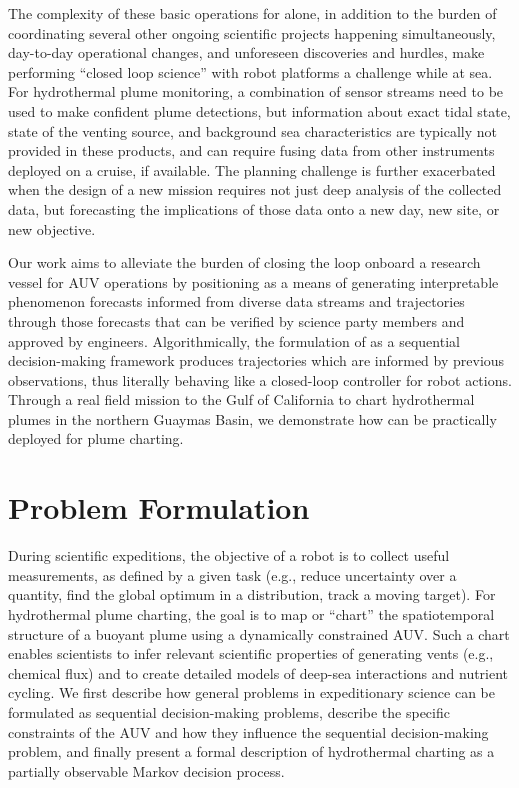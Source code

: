 The complexity of these basic operations for \Sentry alone, in addition to the burden of coordinating several other ongoing scientific projects happening simultaneously, day-to-day operational changes, and unforeseen discoveries and hurdles, make performing ``closed loop science'' with robot platforms a challenge while at sea. For hydrothermal plume monitoring, a combination of sensor streams need to be used to make confident plume detections\autocite{jakuba2007stochastic}, but information about exact tidal state, state of the venting source, and background sea characteristics are typically not provided in these products, and can require fusing data from other instruments deployed on a cruise, if available. The planning challenge is further exacerbated when the design of a new mission requires not just deep analysis of the collected data, but forecasting the implications of those data onto a new day, new site, or new objective. 

Our work aims to alleviate the burden of closing the loop onboard a research vessel for AUV operations by positioning \PHORTEX as a means of generating interpretable phenomenon forecasts informed from diverse data streams and trajectories through those forecasts that can be verified by science party members and approved by \Sentry engineers. Algorithmically, the formulation of \PHORTEX as a sequential decision-making framework produces trajectories which are informed by previous observations, thus literally behaving like a closed-loop controller for robot actions. Through a real field mission to the Gulf of California to chart hydrothermal plumes in the northern Guaymas Basin, we demonstrate how \PHORTEX can be practically deployed for plume charting.

\section{Problem Formulation}
\label{sec:problem}
During scientific expeditions, the objective of a robot is to collect useful measurements, as defined by a given task (e.g., reduce uncertainty over a quantity, find the global optimum in a distribution, track a moving target). For hydrothermal plume charting, the goal is to map or ``chart'' the spatiotemporal structure of a buoyant plume using a dynamically constrained AUV. Such a chart enables scientists to infer relevant scientific properties of generating vents (e.g., chemical flux) and to create detailed models of deep-sea interactions and nutrient cycling. We first describe how general problems in expeditionary science can be formulated as sequential decision-making problems, describe the specific constraints of the AUV \Sentry and how they influence the sequential decision-making problem, and finally present a formal description of hydrothermal charting as a partially observable Markov decision process. 

